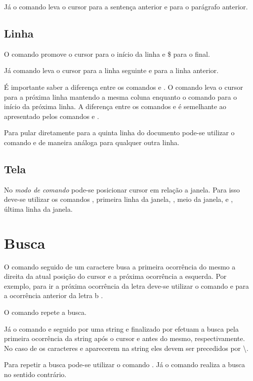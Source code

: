 Já o comando \lcode{(} leva o cursor para a sentença anterior e \lcode{\{} para o parágrafo anterior.

\subsection{Linha}
O comando  promove o cursor para o início da linha e \$ para o final.

Já comando  leva o cursor para a linha seguinte e \lcode{-} para a linha anterior.

É importante saber a diferença entre os comandos  e . O comando  leva o cursor para a próxima linha mantendo a mesma coluna enquanto o comando  para o início da próxima linha. A diferença entre os comandos  e \lcode{-} é semelhante ao apresentado pelos comandos  e .

Para pular diretamente para a quinta linha do documento pode-se utilizar o comando  e de maneira análoga para qualquer outra linha.

\subsection{Tela}
No \textit{modo de comando} pode-se posicionar cursor em relação a janela. Para isso deve-se utilizar os comandos , primeira linha da janela, , meio da janela,  e , última linha da janela.

\section{Busca}
O comando  seguido de um caractere busa a primeira ocorrência do mesmo a direita da atual posição do cursor e  a próxima ocorrência a esquerda. Por exemplo, para ir a próxima ocorrência da letra  deve-se utilizar o comando  e para a ocorrência anterior da letra b .

O comando \lcode{;} repete a busca.

Já o comando \lcode{/} e  seguido por uma string e finalizado por  efetuam a busca pela primeira ocorrência da string após o cursor e antes do mesmo, respectivamente. No caso de os caracteres \lcode{/} e  aparecerem na string eles devem ser precedidos por \textbackslash.

Para repetir a busca pode-se utilizar o comando . Já o comando  realiza a busca no sentido contrário.

